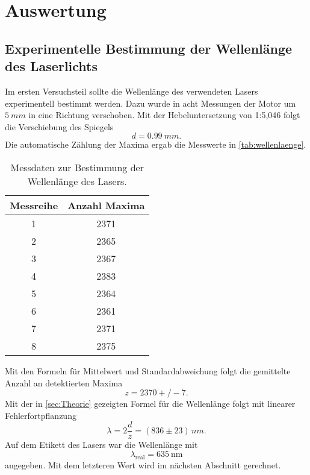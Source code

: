 \section{Auswertung}
\label{sec:Auswertung}

\subsection{Experimentelle Bestimmung der Wellenlänge des Laserlichts}
\label{sec:Experimentelle Bestimmung der Wellenlänge des Laserlichts}
Im ersten Versuchsteil sollte die Wellenlänge des verwendeten Lasers experimentell
bestimmt werden. Dazu wurde in acht Messungen der Motor um $\SI{5}{mm}$ in eine
Richtung verschoben. Mit der Hebeluntersetzung von 1:5,046 folgt die Verschiebung 
des Spiegels
\begin{equation}
	d = \SI{0,99}{mm}.
\end{equation}
Die automatische Zählung der Maxima ergab die Messwerte in \autoref{tab:wellenlaenge}.
\begin{table}
  \centering
  \caption{Messdaten zur Bestimmung der Wellenlänge des Lasers.}
  \label{tab:wellenlaenge}
  \begin{tabular}{c c}
  \toprule
  Messreihe & Anzahl Maxima\\
  \midrule
    1 & 2371 \\
    2 & 2365 \\
    3 & 2367 \\
    4 & 2383 \\
    5 & 2364 \\
    6 & 2361 \\
    7 & 2371 \\
    8 & 2375 \\
  \bottomrule
  \end{tabular}
\end{table}
Mit den Formeln für Mittelwert und Standardabweichung folgt die gemittelte Anzahl an
detektierten Maxima
\begin{equation}
	z = 2370+/-7.
\end{equation}
Mit der in \autoref{sec:Theorie} gezeigten Formel für die Wellenlänge folgt mit linearer
Fehlerfortpflanzung 
\begin{equation}
	\lambda = 2 \frac{d}{z} = (836 \pm 23) \, \si{nm}.
\end{equation}
Auf dem Etikett des Lasers war die Wellenlänge mit
\begin{equation}
	\label{eqn:wellenlaenge-real}
	\lambda_\text{real} = \SI{635}{\nano\meter}
\end{equation}
angegeben. Mit dem letzteren Wert wird im nächsten Abschnitt gerechnet.

